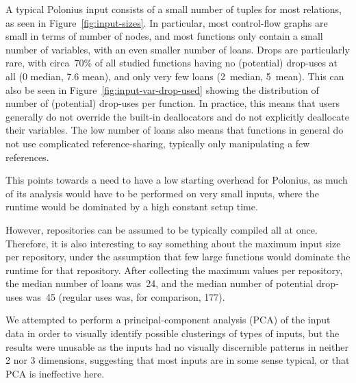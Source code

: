 \documentclass[11pt,a4paper,twoside,openany]{report}
\renewcommand\_{\textunderscore\allowbreak}
\begin{document}
A typical Polonius input consists of a small number of tuples for most
relations, as seen in Figure~\ref{fig:input-sizes}. In particular, most
control-flow graphs are small in terms of number of nodes, and most functions
only contain a small number of variables, with an even smaller number of loans.
Drops are particularly rare, with circa~70\% of all studied functions having
no (potential) drop-uses at all (0 median, 7.6 mean), and only very few
loans (2~median, 5~mean). This can also be seen in
Figure~\ref{fig:input-var-drop-used} showing the distribution of number of
(potential) drop-uses per function. In practice, this means that users generally
do not override the built-in deallocators and do not explicitly deallocate their
variables. The low number of loans also means that functions in general do not
use complicated reference-sharing, typically only manipulating a few references.

This points towards a need to have a low starting overhead for Polonius, as
much of its analysis would have to be performed on very small inputs, where the
runtime would be dominated by a high constant setup time.

However, repositories can be assumed to be typically compiled all at once.
Therefore, it is also interesting to say something about the maximum input size
per repository, under the assumption that few large functions would dominate the
runtime for that repository. After collecting the maximum values per repository,
the median number of loans was~24, and the median number of potential drop-uses
was~45 (regular uses was, for comparison, 177).

We attempted to perform a principal-component analysis (PCA) of the input data
in order to visually identify possible clusterings of types of inputs, but the
results were unusable as the inputs had no visually discernible patterns in
neither 2 nor 3 dimensions, suggesting that most inputs are in some sense
typical, or that PCA is ineffective here.
\end{document}
